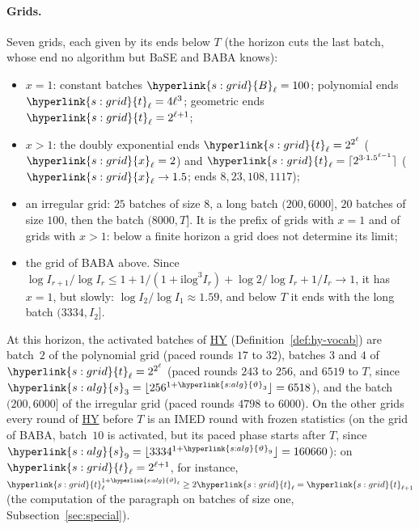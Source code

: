 \documentclass[10pt]{article}
\newcommand{\sy}[2]{{\hyperlink{#1}{#2}}}
\newcommand{\1}{\mathbf{1}}
\newcommand{\tl}{\sy{s:grid}{t}}
\newcommand{\xg}{\sy{s:grid}{x}}
\newcommand{\Bg}{\sy{s:grid}{B}}
\newcommand{\HY}{\hyperref[def:hy]{\textup{HY}}}
\newcommand{\sA}{\sy{s:alg}{s}}
\newcommand{\thv}{\sy{s:alg}{\vartheta}}
\begin{document}
\paragraph{Grids.} Seven grids, each given by its ends below $T$ (the horizon cuts the last batch, whose end no algorithm but BaSE and BABA knows):
\begin{itemize}[leftmargin=*,nosep]
\item $x=1$: constant batches $\Bg_\ell=100$; polynomial ends $\tl_\ell=4\ell^3$; geometric ends $\tl_\ell=2^{\ell+1}$;
\item $x>1$: the doubly exponential ends $\tl_\ell=2^{2^\ell}$ ($\xg_\ell=2$) and $\tl_\ell=\lceil2^{3\cdot1.5^{\ell-1}}\rceil$ ($\xg_\ell\to1.5$; ends $8,23,108,1117$);
\item an irregular grid: $25$ batches of size $8$, a long batch $(200,6000]$, $20$ batches of size $100$, then the batch $(8000,T]$. It is the prefix of grids with
$x=1$ and of grids with $x>1$: below a finite horizon a grid does not determine its limit;
\item the grid of BABA above. Since $\log I_{r+1}/\log I_r\le1+1/(1+\mathrm{ilog}^3I_r)+\log2/\log I_r+1/I_r\to1$, it has
$x=1$, but slowly: $\log I_2/\log I_1\approx1.59$, and below $T$ it ends with the long batch $(3334,I_2]$.
\end{itemize}
At this horizon, the activated batches of \HY{} (Definition~\ref{def:hy-vocab}) are batch~$2$ of the polynomial grid (paced rounds $17$ to $32$), batches $3$ and $4$
of $\tl_\ell=2^{2^\ell}$ (paced rounds $243$ to $256$, and $6519$ to $T$, since $\sA_3=\lfloor256^{1+\thv_3}\rfloor=6518$), and the batch $(200,6000]$ of the irregular
grid (paced rounds $4798$ to $6000$). On the other grids every round of \HY{} before $T$ is an IMED round with frozen statistics (on the grid of BABA, batch~$10$ is activated,
but its paced phase starts after $T$, since $\sA_9=\lfloor3334^{1+\thv_9}\rfloor=160660$): on $\tl_\ell=2^{\ell+1}$, for instance,
$\tl_\ell^{1+\thv_\ell}\ge2\tl_\ell=\tl_{\ell+1}$ (the computation of the paragraph on batches of size one, Subsection~\ref{sec:special}).
\end{document}
